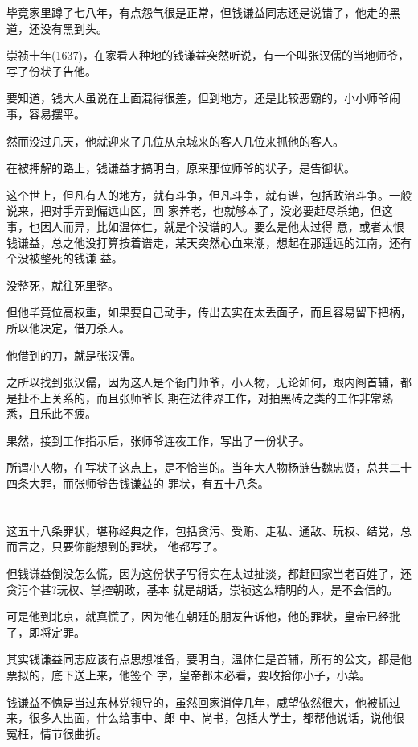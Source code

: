 \documentclass[11pt,a4paper,onecolumn]{article}
\begin{document}
毕竟家里蹲了七八年，有点怨气很是正常，但钱谦益同志还是说错了，他走的黑道，还没有黑到头。

崇祯十年(1637)，在家看人种地的钱谦益突然听说，有一个叫张汉儒的当地师爷，写了份状子告他。

要知道，钱大人虽说在上面混得很差，但到地方，还是比较恶霸的，小小师爷闹事，容易摆平。

然而没过几天，他就迎来了几位从京城来的客人\myrule 几位来抓他的客人。

在被押解的路上，钱谦益才搞明白，原来那位师爷的状子，是告御状。

这个世上，但凡有人的地方，就有斗争，但凡斗争，就有谱，包括政治斗争。一般说来，把对手弄到偏远山区，回
家养老，也就够本了，没必要赶尽杀绝，但这事，也因人而异，比如温体仁，就是个没谱的人。要么是他太过得
意，或者太恨钱谦益，总之他没打算按着谱走，某天突然心血来潮，想起在那遥远的江南，还有个没被整死的钱谦
益。

没整死，就往死里整。

但他毕竟位高权重，如果要自己动手，传出去实在太丢面子，而且容易留下把柄，所以他决定，借刀杀人。

他借到的刀，就是张汉儒。

之所以找到张汉儒，因为这人是个衙门师爷，小人物，无论如何，跟内阁首辅，都是扯不上关系的，而且张师爷长
期在法律界工作，对拍黑砖之类的工作非常熟悉，且乐此不疲。

果然，接到工作指示后，张师爷连夜工作，写出了一份状子。

所谓小人物，在写状子这点上，是不恰当的。当年大人物杨涟告魏忠贤，总共二十四条大罪，而张师爷告钱谦益的
罪状，有五十八条。

\section[\thesection]{}

这五十八条罪状，堪称经典之作，包括贪污、受贿、走私、通敌、玩权、结党，总而言之，只要你能想到的罪状，
他都写了。

但钱谦益倒没怎么慌，因为这份状子写得实在太过扯淡，都赶回家当老百姓了，还贪污个甚?玩权、掌控朝政，基本
就是胡话，崇祯这么精明的人，是不会信的。

可是他到北京，就真慌了，因为他在朝廷的朋友告诉他，他的罪状，皇帝已经批了，即将定罪。

其实钱谦益同志应该有点思想准备，要明白，温体仁是首辅，所有的公文，都是他票拟的，底下送上来，他签个
字，皇帝都未必看，要收拾你小子，小菜。

钱谦益不愧是当过东林党领导的，虽然回家消停几年，威望依然很大，他被抓过来，很多人出面，什么给事中、郎
中、尚书，包括大学士，都帮他说话，说他很冤枉，情节很曲折。
\end{document}
